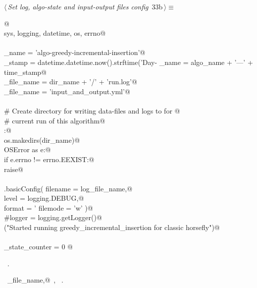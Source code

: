 \documentclass[11.5pt]{report}
\begin{document}
\begin{flushleft} \small\label{scrap38}\raggedright\small
{} $\langle\,${\itshape Set log, algo-state and input-output files config}\nobreak\ {\footnotesize {33b}}$\,\rangle\equiv$
\vspace{-1ex}
\begin{list}{}{} \item
\mbox{}\verb@  @\\
\mbox{}\verb@import sys, logging, datetime, os, errno@\\
\mbox{}\verb@@\\
\mbox{}\verb@algo_name     = 'algo-greedy-incremental-insertion'@\\
\mbox{}\verb@time_stamp    = datetime.datetime.now().strftime('Day-%Y-%m-%d_ClockTime-%H:%M:%S')@\\
\mbox{}\verb@dir_name      = algo_name + '---' + time_stamp@\\
\mbox{}\verb@log_file_name = dir_name + '/' + 'run.log'@\\
\mbox{}\verb@io_file_name  = 'input_and_output.yml'@\\
\mbox{}\verb@@\\
\mbox{}\verb@# Create directory for writing data-files and logs to for @\\
\mbox{}\verb@# current run of this algorithm@\\
\mbox{}\verb@try:@\\
\mbox{}\verb@    os.makedirs(dir_name)@\\
\mbox{}\verb@except OSError as e:@\\
\mbox{}\verb@    if e.errno != errno.EEXIST:@\\
\mbox{}\verb@        raise@\\
\mbox{}\verb@@\\
\mbox{}\verb@logging.basicConfig( filename = log_file_name,@\\
\mbox{}\verb@                     level    = logging.DEBUG,@\\
\mbox{}\verb@                     format   = '%(asctime)s: %(levelname)s: %(message)s',@\\
\mbox{}\verb@                     filemode = 'w' )@\\
\mbox{}\verb@#logger = logging.getLogger()@\\
\mbox{}\verb@info("Started running greedy_incremental_insertion for classic horsefly")@\\
\mbox{}\verb@@\\
\mbox{}\verb@algo_state_counter = 0 @\\
\mbox{}\verb@@{\NWsep}
\end{list}
\vspace{-1.5ex}
\footnotesize
\begin{list}{}{\setlength{\itemsep}{-\parsep}\setlength{\itemindent}{-\leftmargin}}
\item \NWtxtMacroRefIn\ .
\item \NWtxtIdentsDefed\nobreak\  \verb@io_file_name,@\nobreak\ , \verb@logger@\nobreak\ .
\item{}
\end{list}
\vspace{4ex}
\end{flushleft}
\end{document}
